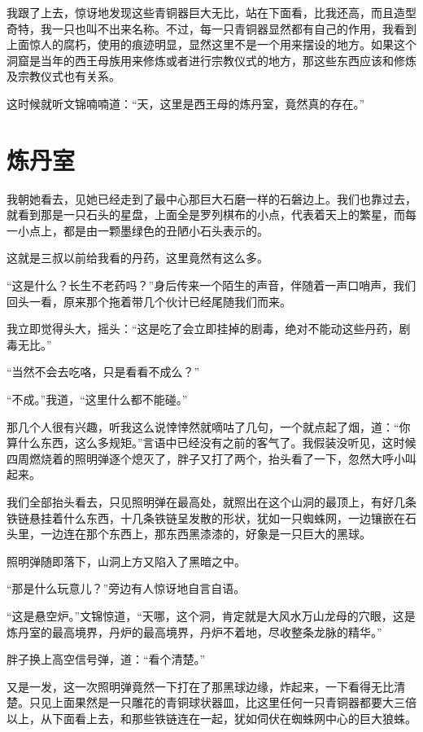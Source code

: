 我跟了上去，惊讶地发现这些青铜器巨大无比，站在下面看，比我还高，而且造型奇特，我一只也叫不出来名称。不过，每一只青铜器显然都有自己的作用，我看到上面惊人的腐朽，使用的痕迹明显，显然这里不是一个用来摆设的地方。如果这个洞窟是当年的西王母族用来修炼或者进行宗教仪式的地方，那这些东西应该和修炼及宗教仪式也有关系。

这时候就听文锦喃喃道：“天，这里是西王母的炼丹室，竟然真的存在。”

\chapter{炼丹室}

我朝她看去，见她已经走到了最中心那巨大石磨一样的石磐边上。我们也靠过去，就看到那是一只石头的星盘，上面全是罗列棋布的小点，代表着天上的繁星，而每一小点上，都是由一颗墨绿色的丑陋小石头表示的。

这就是三叔以前给我看的丹药，这里竟然有这么多。

“这是什么？长生不老药吗？”身后传来一个陌生的声音，伴随着一声口哨声，我们回头一看，原来那个拖着带几个伙计已经尾随我们而来。

我立即觉得头大，摇头：“这是吃了会立即挂掉的剧毒，绝对不能动这些丹药，剧毒无比。”

“当然不会去吃咯，只是看看不成么？”

“不成。”我道，“这里什么都不能碰。”

那几个人很有兴趣，听我这么说悻悻然就嘀咕了几句，一个就点起了烟，道：“你算什么东西，这么多规矩。”言语中已经没有之前的客气了。我假装没听见，这时候四周燃烧着的照明弹逐个熄灭了，胖子又打了两个，抬头看了一下，忽然大呼小叫起来。

我们全部抬头看去，只见照明弹在最高处，就照出在这个山洞的最顶上，有好几条铁链悬挂着什么东西，十几条铁链呈发散的形状，犹如一只蜘蛛网，一边镶嵌在石头里，一边连在那个东西上，那东西黑漆漆的，好象是一只巨大的黑球。

照明弹随即落下，山洞上方又陷入了黑暗之中。

“那是什么玩意儿？”旁边有人惊讶地自言自语。

“这是悬空炉。”文锦惊道，“天哪，这个洞，肯定就是大风水万山龙母的穴眼，这是炼丹室的最高境界，丹炉的最高境界，丹炉不着地，尽收整条龙脉的精华。”

胖子换上高空信号弹，道：“看个清楚。”

又是一发，这一次照明弹竟然一下打在了那黑球边缘，炸起来，一下看得无比清楚。只见上面果然是一只雕花的青铜球状器皿，比这里任何一只青铜器都要大三倍以上，从下面看上去，和那些铁链连在一起，犹如伺伏在蜘蛛网中心的巨大狼蛛。

